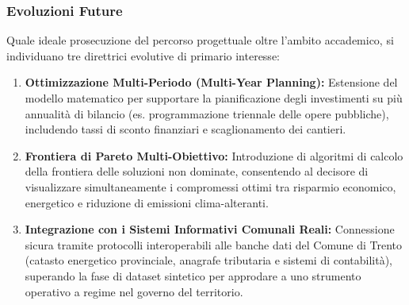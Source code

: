 \subsubsection{Evoluzioni Future}
Quale ideale prosecuzione del percorso progettuale oltre l'ambito accademico, si individuano tre direttrici evolutive di primario interesse:
\begin{enumerate}[leftmargin=1.4em, itemsep=0.2em]
    \item \textbf{Ottimizzazione Multi-Periodo (Multi-Year Planning):} Estensione del modello matematico per supportare la pianificazione degli investimenti su più annualità di bilancio (es. programmazione triennale delle opere pubbliche), includendo tassi di sconto finanziari e scaglionamento dei cantieri.
    \item \textbf{Frontiera di Pareto Multi-Obiettivo:} Introduzione di algoritmi di calcolo della frontiera delle soluzioni non dominate, consentendo al decisore di visualizzare simultaneamente i compromessi ottimi tra risparmio economico, energetico e riduzione di emissioni clima-alteranti.
    \item \textbf{Integrazione con i Sistemi Informativi Comunali Reali:} Connessione sicura tramite protocolli interoperabili alle banche dati del Comune di Trento (catasto energetico provinciale, anagrafe tributaria e sistemi di contabilità), superando la fase di dataset sintetico per approdare a uno strumento operativo a regime nel governo del territorio.
\end{enumerate}
